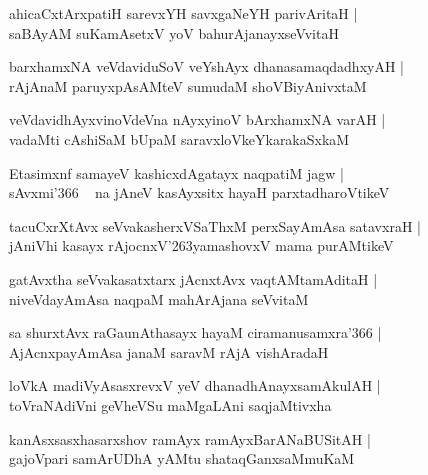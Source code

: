 \documentclass[twoside,12pt,openright]{book}
\def\S{\char'263}
\newcounter{shloka}[chapter]
\begin{document}
\begin{shloka}%
ahicaCxtArxpatiH sarevxYH savxgaNeYH parivAritaH |\\
saBAyAM suKamAsetxV yoV bahurAjanayxseVvitaH
\end{shloka}

\begin{shloka}%
barxhamxNA veVdaviduSoV veYshAyx dhanasamaqdadhxyAH |\\
rAjAnaM paruyxpAsAMteV sumudaM shoVBiyAnivxtaM 
\end{shloka}

\begin{shloka}%
veVdavidhAyxvinoVdeVna nAyxyinoV bArxhamxNA varAH |\\
vadaMti cAshiSaM bUpaM saravxloVkeYkarakaSxkaM 
\end{shloka}

\begin{shloka}%
Etasimxnf samayeV kashicxdAgatayx naqpatiM jagw |\\
sAvxmi\char'366 ~ na jAneV kasAyxsitx hayaH parxtadharoVtikeV 
\end{shloka}

\begin{shloka}%
tacuCxrXtAvx seVvakasherxVSaThxM perxSayAmAsa satavxraH |\\
jAniVhi kasayx rAjocnxV\S yamashovxV mama purAMtikeV 
\end{shloka}

\begin{shloka}%
gatAvxtha seVvakasatxtarx jAcnxtAvx vaqtAMtamAditaH |\\
niveVdayAmAsa naqpaM mahArAjana seVvitaM 
\end{shloka}

\begin{shloka}%
sa shurxtAvx raGaunAthasayx hayaM ciramanusamxra\char'366 |\\
AjAcnxpayAmAsa janaM saravM rAjA vishAradaH 
\end{shloka}

\begin{shloka}%
loVkA madiVyAsasxrevxV yeV dhanadhAnayxsamAkulAH |\\
toVraNAdiVni geVheVSu maMgaLAni saqjaMtivxha 
\end{shloka}

\begin{shloka}%
kanAsxsasxhasarxshov ramAyx ramAyxBarANaBUSitAH |\\
gajoVpari samArUDhA yAMtu shataqGanxsaMmuKaM
\end{shloka}
\end{document}
